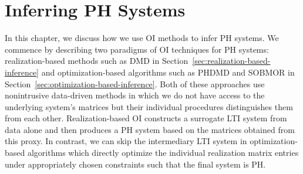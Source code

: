 \chapter[Inferring \texorpdfstring{\acs{PH}}{PH} Systems]{%
    Inferring \texorpdfstring{\acs{PH}}{PH} Systems
}\label{chap:inferring-models}

In this chapter, we discuss how we use \ac{OI} methods to infer \ac{PH} systems.
We commence by describing two paradigms of \ac{OI} techniques for \ac{PH} systems: realization-based methods such as \ac{DMD} in Section~\ref{sec:realization-based-inference} and optimization-based algorithms such as \ac{PHDMD} and \ac{SOBMOR} in Section~\ref{sec:optimization-based-inference}.
Both of these approaches use nonintrusive data-driven methods in which we do not have access to the underlying system's matrices but their individual procedures distinguishes them from each other.
Realization-based \ac{OI} constructs a surrogate \ac{LTI} system from data alone and then produces a \ac{PH} system based on the matrices obtained from this proxy.
In contrast, we can skip the intermediary \ac{LTI} system in optimization-based algorithms which directly optimize the individual realization matrix entries under appropriately chosen constraints such that the final system is \ac{PH}.



